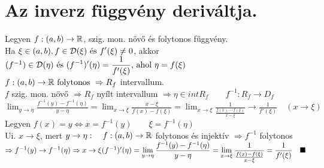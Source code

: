 \documentclass[a4paper,12pt]{article}
\begin{document}
\section{Az inverz függvény deriváltja.}
\tetel Legyen $f:(a,b)\to\mathbb{R}$, szig. mon. növő és folytonos függvény.\\[0.1cm]Ha 
$\xi\in(a,b),f\in\displaystyle\mathcal{D}(\xi) \text{ és }f'(\xi)\neq0$, akkor\\[0.1cm] 
$(f^{-1})\in\displaystyle\mathcal{D}(\eta)\text{ és }(f^{-1})'(\eta)=\frac{1}{f'(\xi)}
\text{, ahol }\eta=f(\xi)$\\[0.2cm]\biz $f:(a,b)\to\mathbb{R}\text{ folytonos }
\Rightarrow R_f$ intervallum.\\[0.2cm] $f$ szig. mon. növő $\Rightarrow R_f$ 
nyílt intervallum $\Rightarrow\eta\in int R_f\quad\quad f^{-1}:R_f\to D_f$
\\[0.2cm] $\displaystyle\lim_{y\to\eta}\frac{f^{-1}(y)-f^{-1}(\eta)}{y-\eta}=
\displaystyle\lim_{x\to\xi}\frac{x-\xi}{f(x)-f(\xi)}=\displaystyle\lim_{x\to\xi}
\frac{1}{\frac{f(x)-f(\xi)}{x-\xi}}\longrightarrow\frac{1}{f'(\xi)}\quad
(x\to\xi)$\\[0.2cm] Legyen $f(x)=y\Leftrightarrow x=f^{-1}(y)\quad
\quad\xi=f^{-1}(\eta)$\\[0.2cm] Ui. $x\to\xi$, mert $y\to\eta:\quad 
f:(a,b)\to\mathbb{R}$ folytonos és injektív $\Rightarrow f^{-1}$ folytonos $\Rightarrow 
f^{-1}(y)\to f^{-1}(\eta)\\[0.1cm]\Rightarrow x\to\xi\\[0.2cm](f^{-1})'(\eta)
=\displaystyle\lim_{y\to\eta}\frac{f^{-1}(y)-f^{-1}(\eta)}{y-\eta}=\lim
\limits_{x\to\xi}\frac{1}{\frac{f(x)-f(\xi)}{x-\xi}}= \frac{1}{f'(\xi)}\quad\blacksquare$
\end{document}
